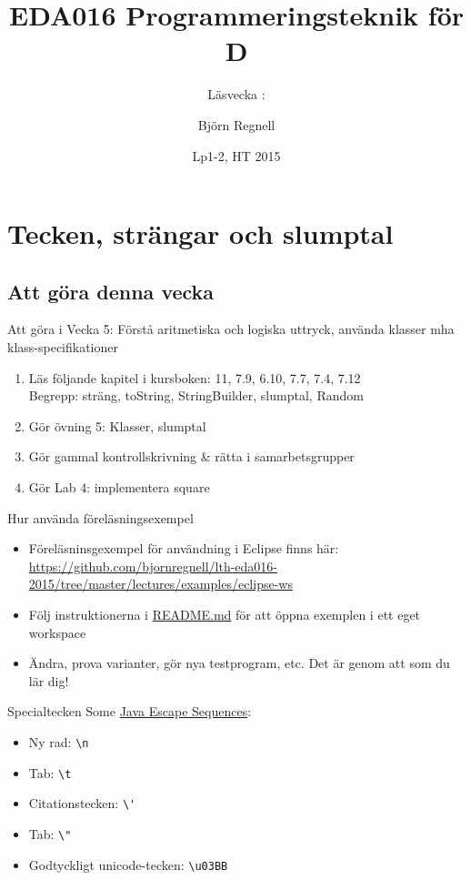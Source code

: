 \documentclass{lecturenotes}
\title[Föreläsningsanteckningar EDA016, 2015]{EDA016 Programmeringsteknik för D}
\subtitle{Läsvecka \vecka: \tema}
\author{Björn Regnell}
\institute{Datavetenskap, LTH}
\date{Lp1-2, HT 2015}
\renewcommand{\vecka}{5}
\newcommand{\tema}{Tecken, strängar och slumptal}
\begin{document}
\frame{\titlepage}
\setnextsection{\vecka}
\section[Vecka \vecka: \tema]{\tema}
\frame{\tableofcontents}


\subsection{Att göra denna vecka}
\begin{Slide}{Att göra i Vecka \vecka: Förstå aritmetiska och logiska uttryck, använda klasser mha klass-specifikationer}
\begin{enumerate}
\item Läs följande kapitel i kursboken: 11, 7.9, 6.10, 7.7, 7.4, 7.12 \\  
Begrepp: sträng, toString, StringBuilder, slumptal, Random
\item Gör övning 5: Klasser, slumptal
\item Gör gammal kontrollskrivning \& rätta i samarbetsgrupper 
\item Gör Lab 4: implementera square
\end{enumerate}
\end{Slide}

\begin{Slide}{Hur använda föreläsningsexempel}
\begin{itemize}
\item Föreläsninsgexempel för användning i Eclipse finns här: \\ {\scriptsize
  \url{https://github.com/bjornregnell/lth-eda016-2015/tree/master/lectures/examples/eclipse-ws} }
\item Följ instruktionerna i \href{https://github.com/bjornregnell/lth-eda016-2015/blob/master/lectures/examples/eclipse-ws/README.md}{README.md} för att öppna exemplen i ett eget workspace
\item Ändra, prova varianter, gör nya testprogram, etc. Det är genom att  som du lär dig!
\end{itemize}
\end{Slide}



\begin{Slide}{Specialtecken}
Some \href{https://docs.oracle.com/javase/tutorial/java/data/characters.html}{Java Escape Sequences}:
\begin{itemize}
\item Ny rad: \verb+\n+
\item Tab: \verb+\t+
\item Citationstecken: \verb+\'+
\item Tab: \verb+\"+
\item Godtyckligt unicode-tecken:  \verb+\u03BB+ 
\end{itemize}
\end{Slide}
\end{document}
